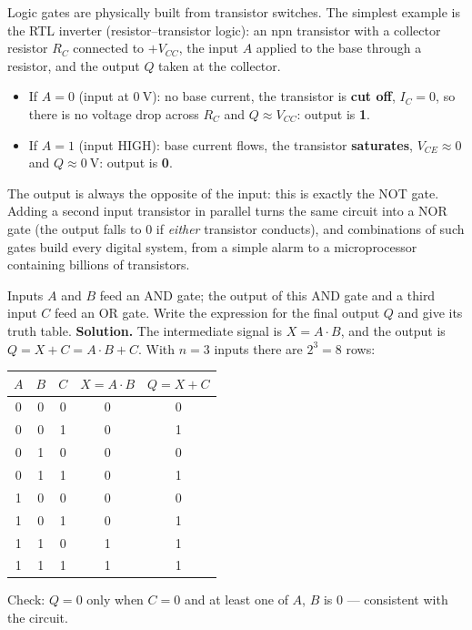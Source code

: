 \documentclass[11pt]{article}
\newcommand{\cle}[1]{{\popxbold\color{popdark}#1}}
\begin{document}
Logic gates are physically built from transistor switches. The simplest example is the \cle{RTL inverter} (resistor--transistor logic): an npn transistor with a collector resistor $R_C$ connected to $+V_{CC}$, the input $A$ applied to the base through a resistor, and the output $Q$ taken at the collector.

\begin{itemize}
\item If $A = 0$ (input at $0\ \mathrm{V}$): no base current, the transistor is \textbf{cut off}, $I_C = 0$, so there is no voltage drop across $R_C$ and $Q \approx V_{CC}$: output is \textbf{1}.
\item If $A = 1$ (input HIGH): base current flows, the transistor \textbf{saturates}, $V_{CE} \approx 0$ and $Q \approx 0\ \mathrm{V}$: output is \textbf{0}.
\end{itemize}

The output is always the opposite of the input: this is exactly the NOT gate. Adding a second input transistor in parallel turns the same circuit into a NOR gate (the output falls to 0 if \emph{either} transistor conducts), and combinations of such gates build every digital system, from a simple alarm to a microprocessor containing billions of transistors.

\begin{exoresolu}
Inputs $A$ and $B$ feed an AND gate; the output of this AND gate and a third input $C$ feed an OR gate. Write the expression for the final output $Q$ and give its truth table.
\tcblower
\textbf{Solution.} The intermediate signal is $X = A\cdot B$, and the output is $Q = X + C = A\cdot B + C$. With $n = 3$ inputs there are $2^3 = 8$ rows:
\begin{center}
\begin{tabular}{|c|c|c|c|c|}
\hline
\rowcolor{popblueL} $A$ & $B$ & $C$ & $X=A\cdot B$ & $Q=X+C$ \\
\hline
0 & 0 & 0 & 0 & 0 \\
\hline
0 & 0 & 1 & 0 & 1 \\
\hline
0 & 1 & 0 & 0 & 0 \\
\hline
0 & 1 & 1 & 0 & 1 \\
\hline
1 & 0 & 0 & 0 & 0 \\
\hline
1 & 0 & 1 & 0 & 1 \\
\hline
1 & 1 & 0 & 1 & 1 \\
\hline
1 & 1 & 1 & 1 & 1 \\
\hline
\end{tabular}
\end{center}
Check: $Q = 0$ only when $C = 0$ and at least one of $A$, $B$ is 0 --- consistent with the circuit.
\end{exoresolu}
\end{document}
